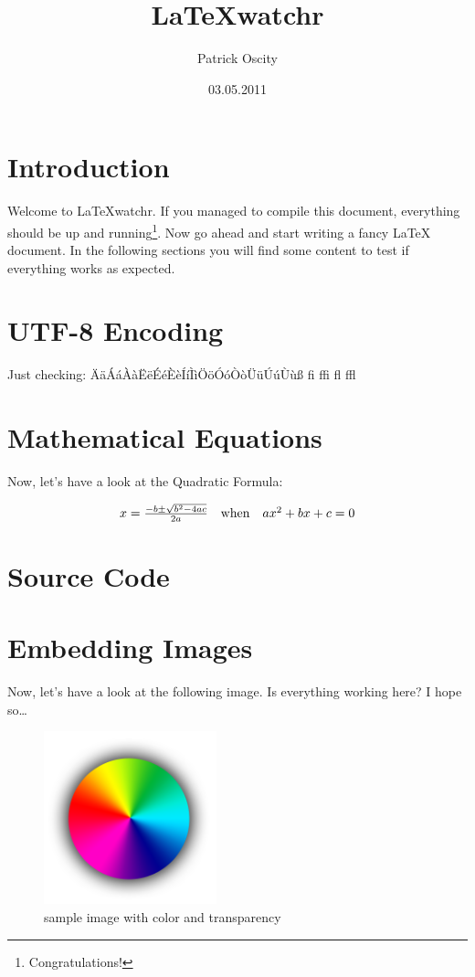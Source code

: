 \documentclass[a4paper,12pt]{scrartcl}
\title{\LaTeX{}watchr}
\author{Patrick Oscity}
\date{03.05.2011}
\begin{document}
\maketitle
\tableofcontents
\pagebreak


\section{Introduction}

Welcome to \LaTeX{}watchr. If you managed to compile this document, everything should be up and running\footnote{Congratulations!}. Now go ahead and start writing a fancy \LaTeX{} document. In the following sections you will find some content to test if everything works as expected.



\section{UTF-8 Encoding}

Just checking: ÄäÁáÀàËëÉéÈèÍíÌìÖöÓóÒòÜüÚúÙùß fi ffi fl ffl



\section{Mathematical Equations}

Now, let's have a look at the Quadratic Formula:

\begin{equation}
    \begin{array}{*{20}c}
       {x = \frac{{ - b \pm \sqrt {b^2  - 4ac} }}{{2a}}} & {{\rm{when}}} & {ax^2  + bx + c = 0}  \\
    \end{array}
\end{equation}



\section{Source Code}





\section{Embedding Images}

Now, let's have a look at the following image. Is everything working here? I hope so…

\begin{figure}[h]
    \centering
    \includegraphics[width=50mm]{images/sample_image.png}
    \caption{sample image with color and transparency}
\end{figure}
\end{document}
